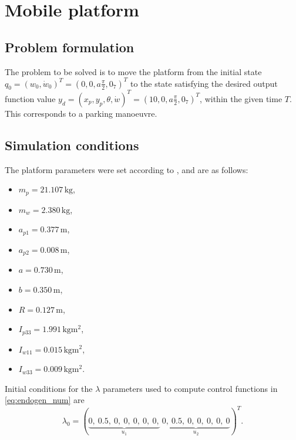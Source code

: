 

\section{Mobile platform}
\subsection{Problem formulation}
\label{sec:rex_task}
The problem to be solved is to move the platform from the initial state
$q_0 = (w_0, \dot{w}_0)^T = (0, 0, a\frac{\pi}{2}, 0_7)^T$ to the state satisfying the desired
output function value
$y_d=(x_p, y_p, \theta, \dot w)^T = (10, 0, a\frac{\pi}{2}, 0_7)^T$, 
within the given time $T$. 
This corresponds to a parking manoeuvre.
%

\subsection{Simulation conditions}
\label{sec:pltf_params}
The platform parameters were set according to \cite{coupled}, and are as follows:
\begin{multicols}{2}
\begin{itemize}
\item $m_p = 21.107\,\mathrm{kg}$,
\item $m_w = 2.380\,\mathrm{kg}$,
\item $a_{p1} = 0.377\,\mathrm{m}$,
\item $a_{p2} = 0.008\,\mathrm{m}$,
\item $a = 0.730\,\mathrm{m}$,
\item $b = 0.350\,\mathrm{m}$,
\item $R = 0.127\,\mathrm{m}$,
\item $I_{p33} = 1.991\,\mathrm{kgm^2}$,
\item $I_{w11} = 0.015\,\mathrm{kgm^2}$,
\item $I_{w33} = 0.009\,\mathrm{kgm^2}$.
\end{itemize}
\end{multicols}
\hspace{-\parindent}Initial conditions for the $\lambda$ parameters used to compute control functions
in \eqref{eq:endogen_num} are
\begin{equation}
\lambda_0=
(\underbrace{0, \ 0.5, \ 0, \ 0, \ 0, \ 0, \ 0,}_{u_1}\ \underbrace{0, \ 0.5, \ 0, \ 0, \ 0, \ 0, \ 0}_{u_2})^T.
\end{equation}
 	

